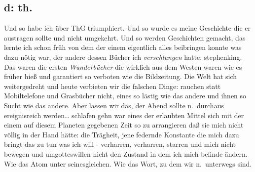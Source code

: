 \documentclass[
]{article}
\author{}
\date{\vspace{-2.5em}}
\begin{document}
\subsection{d: th.}\label{d-th.}

Und so habe ich über ThG triumphiert. Und so wurde es meine Geschichte
die er austragen sollte und nicht umgekehrt. Und so werden Geschichten
gemacht, das lernte ich schon früh von dem der einem eigentlich alles
beibringen konnte was dazu nötig war, der andere dessen Bücher ich
\emph{verschlungen} hatte: stephenking. Das waren die ersten
\emph{Wunderbücher} die wirklich aus dem Westen waren wie es früher hieß
und garantiert so verboten wie die Bildzeitung. Die Welt hat sich
weitergedreht und heute verbieten wir die falschen Dinge: rauchen statt
Mobiltelefone und Grasbücher nicht, eines so lästig wie das andere und
ihnen so Sucht wie das andere. Aber lassen wir das, der Abend sollte
n.~durchaus ereignisreich werden\ldots{} schlafen gehn war eines der
erlaubten Mittel sich mit der einem auf diesem Planeten gegebenen Zeit
so zu arrangieren daß sie mich nicht völlig in der Hand hätte: die
Trägheit, jene federnde Konstante die mich dazu bringt das zu tun was
ich will - verharren, verharren, starren und mich nicht bewegen und
umgotteswillen nicht den Zustand in dem ich mich befinde ändern. Wie das
Atom unter seinesgleichen. Wie das Wort, zu dem wir n.~unterwegs sind.
\end{document}

